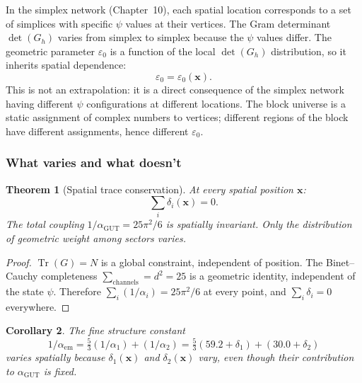 \documentclass[12pt]{article}
\newtheorem{theorem}{Theorem}[section]
\newtheorem{corollary}[theorem]{Corollary}
\theoremstyle{remark}
\theoremstyle{definition}
\newcommand{\tr}{\operatorname{Tr}}
\newcommand{\agut}{\alpha_{\mathrm{GUT}}}
\begin{document}
In the simplex network (Chapter~10), each spatial location corresponds to a set of simplices with specific $\psi$ values at their vertices. The Gram determinant $\det(G_h)$ varies from simplex to simplex because the $\psi$ values differ. The geometric parameter $\varepsilon_0$ is a function of the local $\det(G_h)$ distribution, so it inherits spatial dependence:
\begin{equation}
\varepsilon_0 = \varepsilon_0(\mathbf{x}).
\end{equation}
This is not an extrapolation: it is a direct consequence of the simplex network having different $\psi$ configurations at different locations. The block universe is a static assignment of complex numbers to vertices; different regions of the block have different assignments, hence different $\varepsilon_0$.

\subsubsection{What varies and what doesn't}

\begin{theorem}[Spatial trace conservation]
At every spatial position $\mathbf{x}$:
\begin{equation}
\sum_i \delta_i(\mathbf{x}) = 0.
\end{equation}
The total coupling $1/\agut = 25\pi^2/6$ is spatially invariant. Only the distribution of geometric weight among sectors varies.
\end{theorem}

\begin{proof}
$\tr(G) = N$ is a global constraint, independent of position. The Binet--Cauchy completeness $\sum_\text{channels} = d^2 = 25$ is a geometric identity, independent of the state $\psi$. Therefore $\sum_i(1/\alpha_i) = 25\pi^2/6$ at every point, and $\sum_i \delta_i = 0$ everywhere.
\end{proof}

\begin{corollary}
The fine structure constant
\begin{equation}
1/\alpha_\text{em} = \tfrac{5}{3}(1/\alpha_1) + (1/\alpha_2) = \tfrac{5}{3}(59.2 + \delta_1) + (30.0 + \delta_2)
\end{equation}
varies spatially because $\delta_1(\mathbf{x})$ and $\delta_2(\mathbf{x})$ vary, even though their contribution to $\agut$ is fixed.
\end{corollary}

\end{document}
